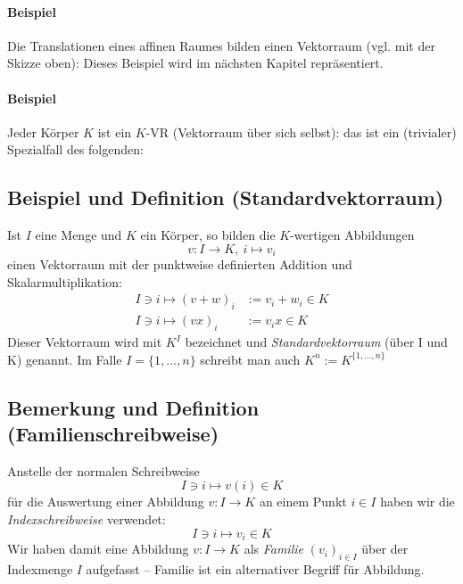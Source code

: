 \paragraph{Beispiel}
	Die Translationen eines affinen Raumes bilden einen Vektorraum (vgl. mit der Skizze oben): Dieses Beispiel wird im nächsten Kapitel repräsentiert.
	
\paragraph{Beispiel}
	Jeder Körper $ K $ ist ein $ K $-VR (Vektorraum über sich selbst): das ist ein (trivialer) Spezialfall des folgenden:
	
\subsection{Beispiel und Definition (Standardvektorraum)}
	\begin{Definition}[Standardvektorraum]
		Ist $ I $ eine Menge und $ K $ ein Körper, so bilden die $ K $-wertigen Abbildungen
		\[ v: I \to K,\ i \mapsto v_i \]
	einen Vektorraum mit der punktweise definierten Addition und Skalarmultiplikation:
	\begin{align*}
		I\ni i \mapsto (v+w)_i &:= v_i+w_i\in K\\
		I\ni i \mapsto (vx)_i &:= v_ix \in K
	\end{align*}
	Dieser Vektorraum wird mit $K^{I}$ bezeichnet und \emph{Standardvektorraum} (über I und K) genannt. Im Falle $ I=\{1,...,n\} $ schreibt man auch $K^{n} := K^{\{1,...,n\}}$
	\end{Definition}

\subsection{Bemerkung und Definition (Familienschreibweise)}
	\begin{Definition}
		Anstelle der normalen Schreibweise
		\[ I\ni i \mapsto v(i) \in K \]
	für die Auswertung einer Abbildung  $v: I \to K$ an einem Punkt $i\in I$ haben wir die \emph{Indexschreibweise} verwendet:	
		\[ I\ni i \mapsto v_i \in K \]
	Wir haben damit eine Abbildung $v: I \to K$ als \emph{Familie} $ (v_i)_{i\in I} $ über der Indexmenge $ I $ aufgefasst -- Familie ist ein \glqq alternativer\grqq{} Begriff für Abbildung.
	\end{Definition}
	
